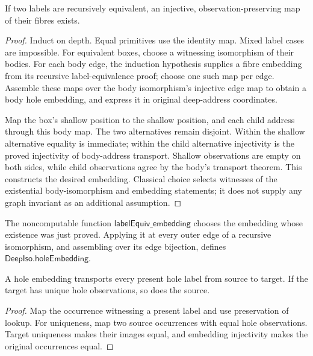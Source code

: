 \begin{lemma}
If two labels are recursively equivalent, an injective, observation-preserving
map of their fibres exists.
\end{lemma}
\begin{proof}
Induct on depth. Equal primitives use the identity map. Mixed label cases are
impossible. For equivalent boxes, choose a witnessing isomorphism of their
bodies. For each body edge, the induction hypothesis supplies a fibre embedding
from its recursive label-equivalence proof; choose one such map per edge.
Assemble these maps over the body isomorphism's injective edge map to obtain a
body hole embedding, and express it in original deep-address coordinates.

Map the box's shallow position to the shallow position, and each child address
through this body map. The two alternatives remain disjoint. Within the shallow
alternative equality is immediate; within the child alternative injectivity is
the proved injectivity of body-address transport. Shallow observations are empty
on both sides, while child observations agree by the body's transport theorem.
This constructs the desired embedding. Classical choice selects witnesses of
the existential body-isomorphism and embedding statements; it does not supply
any graph invariant as an additional assumption.
\end{proof}
The noncomputable function $\mathsf{labelEquiv\_embedding}$ chooses the embedding
whose existence was just proved. Applying it at every outer edge of a recursive
isomorphism, and assembling over its edge bijection, defines
$\mathsf{DeepIso.holeEmbedding}$.

\begin{lemma}
A hole embedding transports every present hole label from source to target. If
the target has unique hole observations, so does the source.
\end{lemma}
\begin{proof}
Map the occurrence witnessing a present label and use preservation of lookup.
For uniqueness, map two source occurrences with equal hole observations. Target
uniqueness makes their images equal, and embedding injectivity makes the
original occurrences equal.
\end{proof}

